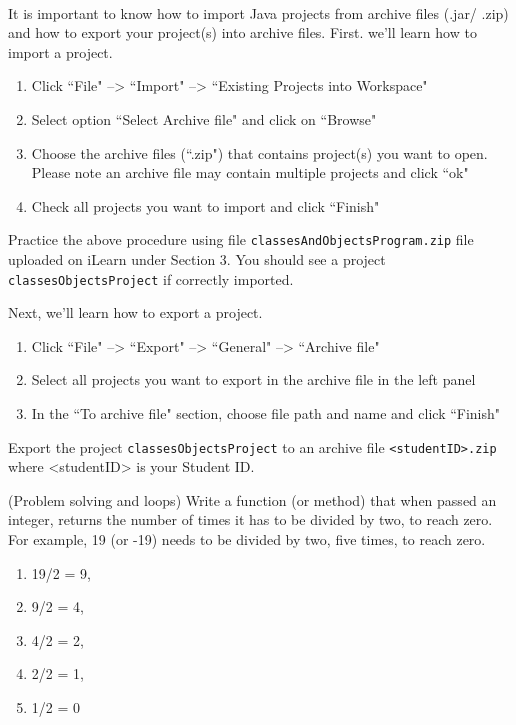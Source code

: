 \documentclass{exam}
\begin{document}
\begin{questions}

\\
 
It is important to know how to import Java projects from archive files (.jar/ .zip) and how to export your project(s) into archive files. First. we'll learn how to import a project.

\begin{enumerate}
\item Click ``File" --> ``Import" --> ``Existing Projects into Workspace"
\item Select option ``Select Archive file" and click on ``Browse"
\item Choose the archive files (``.zip") that contains project(s) you want to open. Please note an archive file may contain multiple projects and click ``ok"
\item Check all projects you want to import and click ``Finish"
\end{enumerate}

Practice the above procedure using file \texttt{classesAndObjectsProgram.zip} file uploaded on iLearn under Section 3. You should see a project \texttt{classesObjectsProject} if correctly imported.

Next, we'll learn how to export a project.

\begin{enumerate}
\item Click ``File" --> ``Export" --> ``General" --> ``Archive file"
\item Select all projects you want to export in the archive file in the left panel
\item In the ``To archive file" section, choose file path and name and click ``Finish"
\end{enumerate}

Export the project \texttt{classesObjectsProject} to an archive file \texttt{<studentID>.zip} where <studentID> is your Student ID.

\question (Problem solving and loops) Write a function (or method) that when passed an integer, returns the number of times it has to be divided by two, to reach zero. For example, 19 (or -19) needs to be divided by two, five times, to reach zero. 

\begin{enumerate}
\item 19/2 = 9, 
\item 9/2 = 4, 
\item 4/2 = 2, 
\item 2/2 = 1, 
\item 1/2 = 0
\end{enumerate}


\end{questions}
\end{document}
